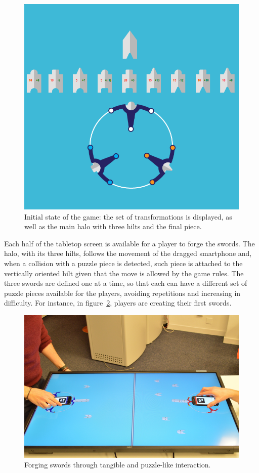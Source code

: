 \begin{figure}[ht!]
  \centering
  \includegraphics[width=.7\textwidth]{images/c5/starting-state.png}
  \caption{Initial state of the game: the set of transformations is displayed, as well as the main halo with three hilts and the final piece.}\label{fig:1}
\end{figure}

Each half of the tabletop screen is available for a player to forge the swords. The halo, with its three hilts, follows the movement of the dragged smartphone and, when a collision with a puzzle piece is detected, such piece is attached to the vertically oriented hilt given that the move is allowed by the game rules. The three swords are defined one at a time, so that each can have a different set of puzzle pieces available for the players, avoiding repetitions and increasing in difficulty. For instance, in figure~\ref{fig:2}, players are creating their first swords.

\begin{figure}[ht!]
  \centering
  \includegraphics[width=.7\textwidth]{images/c5/tangible-interaction.png}
  \caption{Forging swords through tangible and puzzle-like interaction.}\label{fig:2}
\end{figure}

